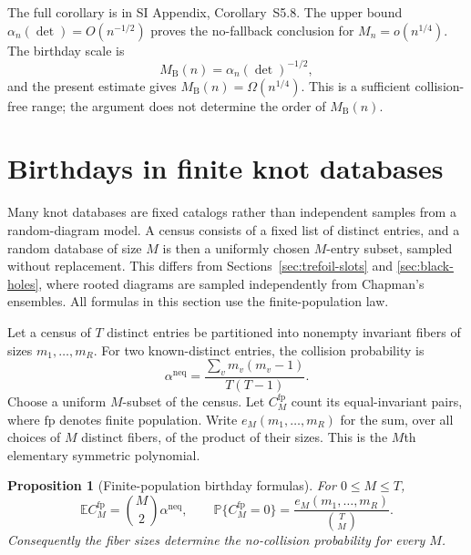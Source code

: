 \documentclass[9pt,twoside]{pnas-new}
\newtheorem{proposition}[theorem]{Proposition}
\theoremstyle{definition}
\theoremstyle{remark}
\renewcommand{\Pr}{\mathbb{P}}
\newcommand{\neqp}{\mathrm{neq}}
\newcommand{\SILocation}[1]{SI Appendix, #1}
\newcommand{\SINoFallbackDatabase}{Corollary~S5.8}
\begin{document}
The full corollary is in \SILocation{\SINoFallbackDatabase{}}.  The upper bound $\alpha_n(\det)=O(n^{-1/2})$ proves the no-fallback conclusion for $M_n=o(n^{1/4})$. The birthday scale is
\[
 M_{\mathrm B}(n)=\alpha_n(\det)^{-1/2},
\]
and the present estimate gives $M_{\mathrm B}(n)=\Omega(n^{1/4})$. This is a sufficient collision-free range; the argument does not determine the order of $M_{\mathrm B}(n)$.
\section{Birthdays in finite knot databases}
\label{sec:finite-databases}
Many knot databases are fixed catalogs rather than independent samples from a random-diagram model.  A census consists of a fixed list of distinct entries, and a random database of size $M$ is then a uniformly chosen $M$-entry subset, sampled without replacement.  This differs from Sections~\ref{sec:trefoil-slots} and \ref{sec:black-holes}, where rooted diagrams are sampled independently from Chapman's ensembles.  All formulas in this section use the finite-population law.

Let a census of $T$ distinct entries be partitioned into nonempty invariant fibers of sizes $m_1,\ldots,m_R$.  For two known-distinct entries, the collision probability is
\begin{equation}
 \alpha^{\neqp}
 =\frac{\sum_v m_v(m_v-1)}{T(T-1)}.
 \label{eq:finite-replacement-correction}
\end{equation}
Choose a uniform $M$-subset of the census.  Let $C_M^{\mathrm{fp}}$ count its equal-invariant pairs, where $\mathrm{fp}$ denotes finite population.  Write $e_M(m_1,\ldots,m_R)$ for the sum, over all choices of $M$ distinct fibers, of the product of their sizes.  This is the $M$th elementary symmetric polynomial.

\begin{proposition}[Finite-population birthday formulas]
\label{prop:exact-finite-census}
For $0\le M\le T$,
\begin{equation}
 \mathbb E C_M^{\mathrm{fp}}
 =\binom M2\alpha^{\neqp},
 \qquad
 \Pr\{C_M^{\mathrm{fp}}=0\}
 =\frac{e_M(m_1,\ldots,m_R)}{\binom TM}.
 \label{eq:exact-finite-birthday}
\end{equation}
Consequently the fiber sizes determine the no-collision probability for every $M$.
\end{proposition}
\end{document}
